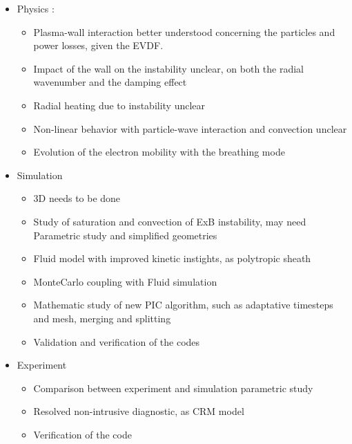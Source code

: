 \begin{itemize}
  \item Physics :
  \begin{itemize}
    \item Plasma-wall interaction better understood concerning the particles and power losses, given the EVDF. 
    \item Impact of the wall on the instability unclear, on both the radial wavenumber and the damping effect
    \item Radial heating due to instability unclear
    \item Non-linear behavior with particle-wave interaction and convection unclear
    \item Evolution of the electron mobility with the breathing mode
  \end{itemize}
  \item Simulation
  \begin{itemize}
    \item 3D needs to be done
    \item Study of saturation and convection of ExB instability, may need Parametric study and simplified geometries
    \item Fluid model with improved kinetic instights, as polytropic sheath
    \item MonteCarlo coupling with Fluid simulation
    \item Mathematic study of new PIC algorithm, such as adaptative timesteps and mesh, merging and splitting
    \item Validation and verification of the codes
  \end{itemize}
  \item Experiment
  \begin{itemize}
    \item Comparison between experiment and simulation parametric study
    \item Resolved non-intrusive diagnostic, as CRM model
    \item Verification of the code
  \end{itemize}
  
\end{itemize}



